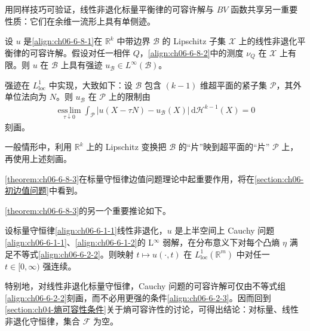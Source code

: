 \documentclass[../../main.tex]{subfiles}
\begin{document}
用同样技巧可验证，线性非退化标量平衡律的可容许解与 $BV$ 函数共享另一重要性质：它们在余维一流形上具有单侧迹。

\begin{theorem}\label{theorem:ch06-6-8-3}
设 $u$ 是\eqref{align:ch06-6-8-1}在 $\mathbb{R}^{k}$ 中带边界 $\mathscr{B}$ 的 Lipschitz 子集 $\mathscr{X}$ 上的线性非退化平衡律的可容许解。假设对任一相伴 $Q$，\eqref{align:ch06-6-8-2}中的测度 $\nu_{Q}$ 在 $\mathscr{X}$ 上有限。则 $u$ 在 $\mathscr{B}$ 上具有强迹 $u_{\mathscr{B}}\in L^{\infty}(\mathscr{B})$。
\end{theorem}

强迹在 $L^{1}_{\mathrm{loc}}$ 中实现，大致如下：设 $\mathscr{B}$ 包含 $(k-1)$ 维超平面的紧子集 $\mathscr{P}$，其外单位法向为 $N$。则 $u_{\mathscr{B}}$ 在 $\mathscr{P}$ 上的限制由
\begin{align}
\operatorname*{ess\,lim}_{\tau\downarrow 0}\int_{\mathscr{P}}|u(X-\tau N)-u_{\mathscr{B}}(X)|\,\mathrm{d}\mathscr{H}^{k-1}(X)=0
\label{align:ch06-6-8-9}
\end{align}
刻画。

一般情形中，利用 $\mathbb{R}^{k}$ 上的 Lipschitz 变换把 $\mathscr{B}$ 的“片”映到超平面的“片” $\mathscr{P}$ 上，再使用上述刻画。

\cref{theorem:ch06-6-8-3}在标量守恒律边值问题理论中起重要作用，将在\cref{section:ch06-初边值问题}中看到。

\cref{theorem:ch06-6-8-3}的另一个重要推论如下。

\begin{corollary}\label{corollary:ch06-6-8-4}
设标量守恒律\eqref{align:ch06-6-1-1}线性非退化，$u$ 是上半空间上 Cauchy 问题\eqref{align:ch06-6-1-1}、\eqref{align:ch06-6-1-2}的 L$^{\infty}$ 弱解，在分布意义下对每个凸熵 $\eta$ 满足不等式\eqref{align:ch06-6-2-2}。则映射 $t\mapsto u(\cdot,t)$ 在 $L^{1}_{\mathrm{loc}}(\mathbb{R}^{m})$ 中对任一 $t\in[0,\infty)$ 强连续。
\end{corollary}

特别地，对线性非退化标量守恒律，Cauchy 问题的可容许解可仅由不等式组\eqref{align:ch06-6-2-2}刻画，而不必用更强的条件\eqref{align:ch06-6-2-3}。因而回到\cref{section:ch04-熵可容性条件}关于熵可容许性的讨论，可得出结论：对标量、线性非退化守恒律，集合 $\mathscr{F}$ 为空。
\end{document}

